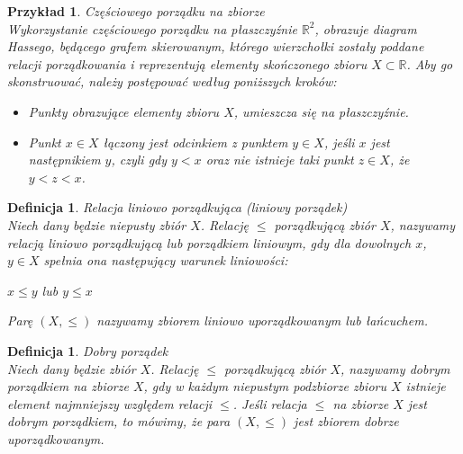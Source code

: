 \documentclass[12pt,a4paper]{report}
\newtheorem{definition}[theorem]{Definicja}
\newtheorem{example}{Przykład}
\begin{document}
\begin{example}{Częściowego porządku na zbiorze\\}
Wykorzystanie częściowego porządku na płaszczyźnie $\mathbb{R}^2$, obrazuje diagram Hassego, będącego grafem skierowanym, którego wierzchołki zostały poddane relacji porządkowania i reprezentują elementy  skończonego zbioru $X \subset \mathbb{R}$. 
Aby go skonstruować, należy postępować według poniższych kroków:
\begin{itemize}
\item Punkty obrazujące elementy zbioru $X$, umieszcza się na płaszczyźnie.
\item Punkt $x\in X$ łączony jest odcinkiem z punktem $y \in X$, jeśli $x$ jest następnikiem $y$, czyli gdy $y <x$ oraz nie istnieje taki punkt $z \in X$, że $y<z<x$.
\end{itemize}
\end{example}


\begin{definition}{Relacja liniowo porządkująca (liniowy porządek) \cite[Rozdział 2]{blaszczyk2007}\\}
Niech dany będzie niepusty zbiór $X$. Relację $\leq$ porządkującą zbiór $X$, nazywamy relacją liniowo porządkującą lub porządkiem liniowym, gdy dla dowolnych $x$, $y \in X$ spełnia ona następujący warunek liniowości:
\begin{center}
$x \leq y$ lub $y \leq x$
\end{center}
Parę $(X, \leq)$ nazywamy zbiorem liniowo uporządkowanym lub łańcuchem.\\
\end{definition}

\begin{definition}{Dobry porządek \cite[Rozdział 2]{blaszczyk2007}\\}
Niech dany będzie zbiór $X$. Relację $\leq$ porządkującą zbiór $X$, nazywamy dobrym porządkiem na zbiorze $X$, gdy w każdym niepustym podzbiorze zbioru $X$ istnieje element najmniejszy względem relacji $\leq$. Jeśli relacja $\leq$ na zbiorze $X$ jest dobrym porządkiem, to mówimy, że para $(X,\leq)$ jest zbiorem dobrze uporządkowanym.\\
\end{definition}
\end{document}
